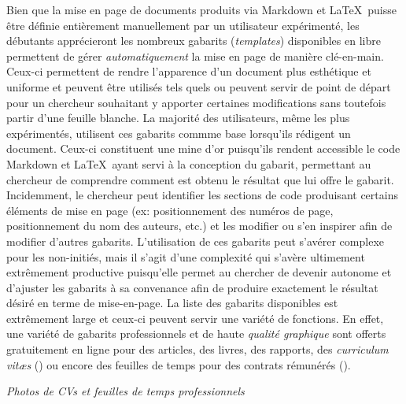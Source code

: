 \documentclass[
  letterpaper,
  DIV=11,
  numbers=noendperiod]{scrreprt}
\begin{document}
Bien que la mise en page de documents produits via Markdown et
\LaTeX~puisse être définie entièrement manuellement par un utilisateur
expérimenté, les débutants apprécieront les nombreux gabarits
(\emph{templates}) disponibles en libre permettent de gérer
\emph{automatiquement} la mise en page de manière clé-en-main. Ceux-ci
permettent de rendre l'apparence d'un document plus esthétique et
uniforme et peuvent être utilisés tels quels ou peuvent servir de point
de départ pour un chercheur souhaitant y apporter certaines
modifications sans toutefois partir d'une feuille blanche. La majorité
des utilisateurs, même les plus expérimentés, utilisent ces gabarits
commme base lorsqu'ils rédigent un document. Ceux-ci constituent une
mine d'or puisqu'ils rendent accessible le code Markdown et \LaTeX~ayant
servi à la conception du gabarit, permettant au chercheur de comprendre
comment est obtenu le résultat que lui offre le gabarit. Incidemment, le
chercheur peut identifier les sections de code produisant certains
éléments de mise en page (ex: positionnement des numéros de page,
positionnement du nom des auteurs, etc.) et les modifier ou s'en
inspirer afin de modifier d'autres gabarits. L'utilisation de ces
gabarits peut s'avérer complexe pour les non-initiés, mais il s'agit
d'une complexité qui s'avère ultimement extrêmement productive
puisqu'elle permet au chercher de devenir autonome et d'ajuster les
gabarits à sa convenance afin de produire exactement le résultat désiré
en terme de mise-en-page. La liste des gabarits disponibles est
extrêmement large et ceux-ci peuvent servir une variété de fonctions. En
effet, une variété de gabarits professionnels et de haute \emph{qualité
graphique} sont offerts gratuitement en ligne pour des articles, des
livres, des rapports, des \emph{curriculum vitæs} () ou encore des
feuilles de temps pour des contrats rémunérés ().

\emph{Photos de CVs et feuilles de temps professionnels}
\end{document}
